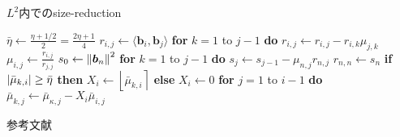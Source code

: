 \documentclass[12pt,aspectratio=169,xcolor=dvipsnames,table,dvipdfmx, leqno]{beamer}
\newcommand{\round}[1]{\left\lfloor #1 \right\rceil}
\begin{document}
\begin{frame}{}
\begin{algorithm}[H]
    \footnotesize
    \begin{algorithmic}[1]
        \caption{\footnotesize $L^2$内でのsize-reduction}
        \label{alg_LLL}
        \State $\bar{\eta}\gets\frac{\eta+1/2}{2}=\frac{2\eta+1}{4}$
        \Do
                \State $r_{i, j}\gets \langle\bm{b}_i, \bm{b}_j\rangle$
                \State \textbf{for} $k=1$ to $j-1$ \textbf{do} $r_{i, j}\gets r_{i, j}-r_{i, k}\mu_{j, k}$
                \State $\mu_{i, j}\gets \frac{r_{i, j}}{r_{j, j}}$
            \EndFor
            \State $s_0\gets \norm{\bm{b}_n}^2$
            \State \textbf{for} $k = 1$ to $j-1$ \textbf{do} $s_j\gets s_{j-1}-\mu_{n, j}r_{n, j}$
            \State $r_{n, n}\gets s_n$
                \State \textbf{if} $\abs{\bar{\mu}_{k, i}}\ge \bar{\eta}$ \textbf{then} $X_i\gets \round{\bar{\mu}_{k, i}}$ \textbf{else} $X_i\gets 0$
                \State \textbf{for} $j=1$ to $i-1$ \textbf{do} $\bar{\mu}_{k, j}\gets \bar{\mu}_{\kappa, j}-X_i\bar{\mu}_{i, j}$
            \EndFor
    \end{algorithmic}
\end{algorithm}
\end{frame}

\begin{frame}[allowframebreaks]{参考文献}
\beamertemplatetextbibitems


\end{frame}
\end{document}
